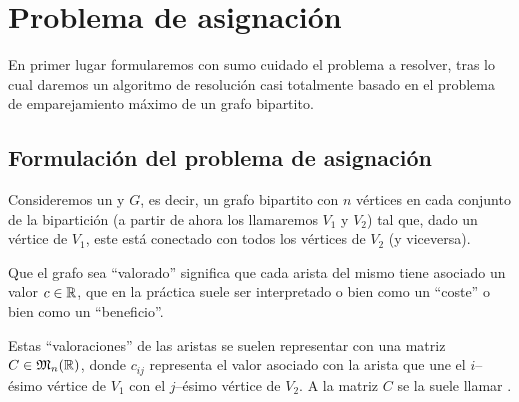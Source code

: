 \section{Problema de asignación}
En primer lugar formularemos con sumo cuidado el problema a resolver, tras lo cual daremos un algoritmo de resolución casi totalmente basado en el problema de emparejamiento máximo de un grafo bipartito.
\subsection{Formulación del problema de asignación}
Consideremos un  y  $G$, es decir, un grafo bipartito con $n$ vértices en cada conjunto de la bipartición (a partir de ahora los llamaremos $V_1$ y $V_2$) tal que, dado un vértice de $V_1$, este está conectado con todos los vértices de $V_2$ (y viceversa).

Que el grafo sea ``valorado'' significa que cada arista del mismo tiene asociado un valor $c\in\mathbb{R}$, que en la práctica suele ser interpretado o bien como un ``coste'' o bien como un ``beneficio''.

Estas ``valoraciones'' de las aristas se suelen representar con una matriz $C\in\mathfrak{M}_n(\mathbb{R})$, donde $c_{ij}$ representa el valor asociado con la arista que une el $i$--ésimo vértice de $V_1$ con el $j$--ésimo vértice de $V_2$. A la matriz $C$ se la suele llamar .

